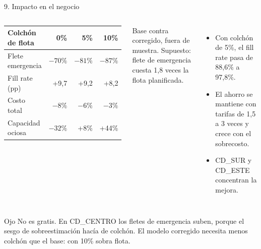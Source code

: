 \documentclass[aspectratio=169,10pt]{beamer}
\begin{document}
\begin{frame}{9. Impacto en el negocio}
\begin{columns}[T]
\begin{center}
\small
\begin{tabular}{lrrr}
\toprule
Colchón de flota & 0\% & 5\% & 10\% \\
\midrule
Flete emergencia & $-70\%$ & $-81\%$ & $-87\%$ \\
Fill rate (pp) & +9,7 & +9,2 & +8,2 \\
Costo total & $-8\%$ & $-6\%$ & $-3\%$ \\
Capacidad ociosa & $-32\%$ & +8\% & +44\% \\
\bottomrule
\end{tabular}
\end{center}
{\footnotesize\color{gris} Base contra corregido, fuera de muestra. Supuesto: flete de emergencia cuesta 1,8 veces la flota planificada.}
\begin{itemize}
\item Con colchón de 5\%, el fill rate pasa de 88,6\% a 97,8\%.
\item El ahorro se mantiene con tarifas de 1,5 a 3 veces y crece con el sobrecosto.
\item CD\_SUR y CD\_ESTE concentran la mejora.
\end{itemize}
\end{columns}
\vspace{0.5em}
\begin{alertblock}{Ojo}
No es gratis. En CD\_CENTRO los fletes de emergencia suben, porque el sesgo de sobreestimación hacía de colchón. El modelo corregido necesita menos colchón que el base: con 10\% sobra flota.
\end{alertblock}
\end{frame}
\end{document}

